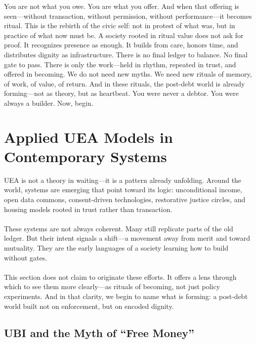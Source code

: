 \documentclass[12pt]{article}
\begin{document}
\noindent You are not what you owe. You are what you offer. And when that offering is seen—without transaction, without permission, without performance—it becomes ritual. This is the rebirth of the civic self: not in protest of what was, but in practice of what now must be. A society rooted in ritual value does not ask for proof. It recognizes presence as enough. It builds from care, honors time, and distributes dignity as infrastructure. There is no final ledger to balance. No final gate to pass. There is only the work—held in rhythm, repeated in trust, and offered in becoming. We do not need new myths. We need new rituals of memory, of work, of value, of return. And in these rituals, the post-debt world is already forming—not as theory, but as heartbeat. You were never a debtor. You were always a builder. Now, begin.


\section{Applied UEA Models in Contemporary Systems}

UEA is not a theory in waiting—it is a pattern already unfolding. Around the world, systems are emerging that point toward its logic: unconditional income, open data commons, consent-driven technologies, restorative justice circles, and housing models rooted in trust rather than transaction.

\paragraph{}These systems are not always coherent. Many still replicate parts of the old ledger. But their intent signals a shift—a movement away from merit and toward mutuality. They are the early languages of a society learning how to build without gates.

\paragraph{}This section does not claim to originate these efforts. It offers a lens through which to see them more clearly—as rituals of becoming, not just policy experiments. And in that clarity, we begin to name what is forming: a post-debt world built not on enforcement, but on encoded dignity.

\subsection{UBI and the Myth of ``Free Money''}
\end{document}
